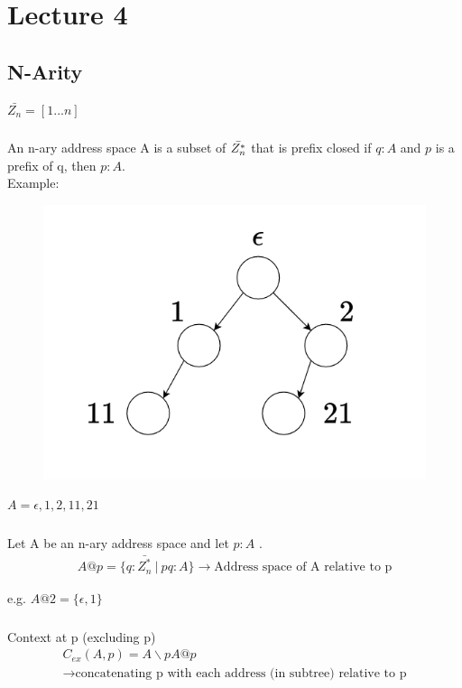 \section{Lecture 4}
\subsection{N-Arity}
$\bar{Z_{n}} = [1...n]$

\subsubsection{}An n-ary address space A is a subset of $\Bar{Z^{*}_{n}}$ that is prefix closed if $q: A$ and $p$ is a prefix of q, then $p: A$.\\

Example:
\begin{figure}[htbp]
    \center
    \includegraphics[scale=0.8]{images/popl-4-1.png}
    \caption{}
\end{figure}

$A = {\epsilon, 1, 2, 11, 21}$
\subsubsection{}
Let A be an n-ary address space and let $p:A$ .
\begin{gather}
    A@p = \{q: \bar{Z_{n}^{*}}\  \vert\  pq: A\}  \xrightarrow{} \text{Address space of A relative to p}
\end{gather}

e.g.
\indent $A@2 = \{\epsilon, 1\}$

\subsubsection{}
Context at p (excluding p)
\begin{gather}
    C_{ex}(A, p) = A\backslash pA@p\\
    \xrightarrow{} \text{concatenating p with each address (in subtree) relative to p}
\end{gather}

